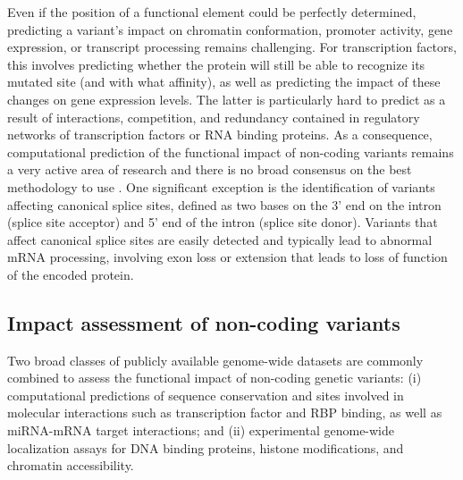 Even if the position of a functional element could be perfectly determined, predicting a variant's impact on chromatin conformation, promoter activity, gene expression, or transcript processing remains challenging. For transcription factors, this involves predicting whether the protein will still be able to recognize its mutated site (and with what affinity), as well as predicting the impact of these changes on gene expression levels. The latter is particularly hard to predict as a result of interactions, competition, and redundancy contained in regulatory networks of transcription factors or RNA binding proteins. As a consequence, computational prediction of the functional impact of non-coding variants remains a very active area of research and there is no broad consensus on the best methodology to use \cite{ward2012interpreting}. One significant exception is the identification of variants affecting canonical splice sites, defined as two bases on the 3' end on the intron (splice site acceptor) and 5' end of the intron (splice site donor). Variants that affect canonical splice sites are easily detected and typically lead to abnormal mRNA processing, involving exon loss or extension that leads to loss of function of the encoded protein.

\subsection{Impact assessment of non-coding variants}

Two broad classes of publicly available genome-wide datasets are commonly combined to assess the functional impact of non-coding genetic variants: (i) computational predictions of sequence conservation and sites involved in molecular interactions such as transcription factor and RBP binding, as well as miRNA-mRNA target interactions; and (ii) experimental genome-wide localization assays for DNA binding proteins, histone modifications, and chromatin accessibility.

